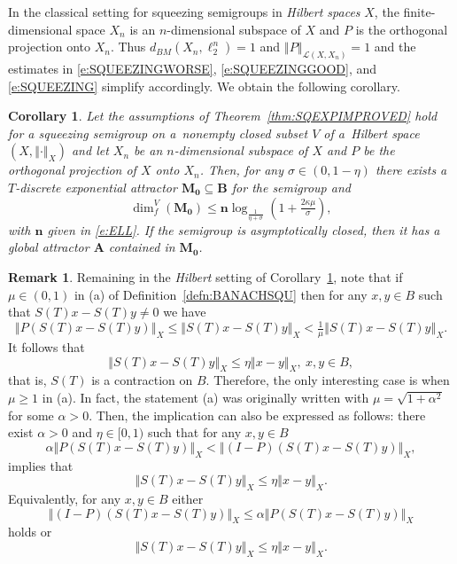 \documentclass[a4paper,12pt,reqno]{amsart}
\theoremstyle{plain}
\newtheorem{cor}[lem]{Corollary}
\theoremstyle{definition}
\newtheorem{rem}[lem]{Remark}
\numberwithin{equation}{section}
\newcommand{\norm}[1]{\left\Vert#1\right\Vert}
\newcommand{\dimf}{\operatorname{dim}_{f}}
\renewcommand{\geq}{\geqslant}
\renewcommand{\leq}{\leqslant}
\begin{document}
In the classical setting for squeezing semigroups in \emph{Hilbert spaces} $X$, the finite-dimensional space $X_n$ is an $n$-dimensional subspace of $X$ and $P$ is the orthogonal projection onto $X_n$. Thus $d_{BM}(X_n,\ell^n_2)=1$ and $\norm{P}_{\mathcal{L}(X,X_n)}=1$ and the estimates in  
\eqref{e:SQUEEZINGWORSE}, \eqref{e:SQUEEZINGGOOD}, and \eqref{e:SQUEEZING} simplify accordingly.
We obtain the following corollary. 

\begin{cor}\label{cor:6.6}
Let the assumptions of Theorem~\ref{thm:SQEXPIMPROVED} hold for a squeezing semigroup on a~nonempty closed subset $V$ of a~Hilbert space $(X,\norm{\cdot}_{X})$ and let  $X_n$ be an $n$-dimensional subspace of $X$ and $P$ be the orthogonal projection of $X$ onto $X_n$. Then, for any $\sigma\in (0,1-\eta)$ there exists a~$T$-discrete exponential attractor $\mathbf{M_0}\subseteq \mathbf{B}$ for the semigroup and 
\begin{equation*}
\dimf^{V}(\mathbf{M_0})\leq \mathbf{n}\log_{\frac{1}{\eta+\sigma}}\left(1+\tfrac{2\kappa\mu}{\sigma}\right),
\end{equation*}
with $\mathbf{n}$ given in \eqref{e:ELL}. If the semigroup is asymptotically closed, then it has a global attractor $\mathbf{A}$  contained in $\mathbf{M_0}$.
\end{cor}

\begin{rem}
Remaining in the \emph{Hilbert} setting of Corollary~\ref{cor:6.6}, note that if $\mu\in(0,1)$ in (a) of Definition~\ref{defn:BANACHSQU} then 
for any $x,y\in B$ such that $S(T)x-S(T)y\neq 0$ we have 
$$\norm{P(S(T)x-S(T)y)}_{X}\leq\norm{S(T)x-S(T)y}_{X}<\tfrac{1}{\mu}\norm{S(T)x-S(T)y}_{X}.$$
It follows that 
$$\norm{S(T)x-S(T)y}_{X}\leq\eta\norm{x-y}_{X},\ x,y\in B,$$
that is, $S(T)$ is a contraction on $B$.
Therefore, the only interesting case is when $\mu\geq 1$ in (a).  In fact, the statement (a) was originally written with $\mu=\sqrt{1+\alpha^2}$ for some $\alpha>0$. Then,  the implication can also be  expressed as follows:
there exist $\alpha>0$ and $\eta\in[0,1)$ such that for any $x,y\in B$ 
\begin{equation*}
\alpha\norm{P(S(T)x-S(T)y)}_{X}<\norm{(I-P)(S(T)x-S(T)y)}_{X},
\end{equation*}
implies that 
$$\norm{S(T)x-S(T)y}_{X}\leq\eta\norm{x-y}_{X}.$$
Equivalently, for any $x,y\in B$
either
\begin{equation*}
\norm{(I-P)(S(T)x-S(T)y)}_{X}\leq\alpha\norm{P(S(T)x-S(T)y)}_{X}
\end{equation*}
holds or
\begin{equation*}
\norm{S(T)x-S(T)y}_{X}\leq\eta\norm{x-y}_{X}.
\end{equation*}
\end{rem}
\end{document}
